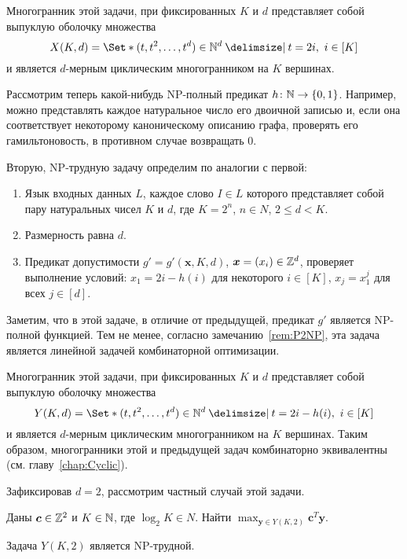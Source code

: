 Многогранник этой задачи, при фиксированных $K$ и $d$ представляет собой выпуклую оболочку множества
\[
X(K,d) = \Set*{(t, t^2, \dots, t^d) \in \N^d \given t = 2i, \ i\in[K]}
\]
и является $d$-мерным циклическим многогранником на $K$ вершинах.

Рассмотрим теперь какой-нибудь NP-полный предикат $h \colon \mathbb{N} \to \{0,1\}$. 
Например, можно представлять каждое натуральное число его двоичной записью и, если она соответствует некоторому каноническому описанию графа, проверять его гамильтоновость, в противном случае возвращать 0.

Вторую, NP-трудную задачу определим по аналогии с первой:
\begin{enumerate}
	\item Язык входных данных $L$, каждое слово $I \in L$ которого представляет собой пару натуральных чисел $K$ и $d$, где $K = 2^n$, $n \in N$, $2 \le d < K$.
	\item Размерность равна $d$.
	\item Предикат допустимости $g' = g'(\bm{x},K,d)$, $\bm{x} = (x_i) \in \mathbb{Z}^d$, проверяет выполнение условий: $x_1 = 2i - h(i)$ для некоторого $i \in [K]$, $x_j = x_1^j$ для всех $j \in [d]$.
\end{enumerate}
Заметим, что в этой задаче, в отличие от предыдущей, предикат $g'$ является NP-полной функцией.
Тем не менее, согласно замечанию~\ref{rem:P2NP}, эта задача является линейной задачей комбинаторной оптимизации.

Многогранник этой задачи, при фиксированных $K$ и $d$ представляет собой выпуклую оболочку множества
\[
Y(K,d) = \Set*{(t, t^2, \dots, t^d) \in \N^d \given t = 2i - h(i), \ i\in[K]}
\]
и является $d$-мерным циклическим многогранником на $K$ вершинах.
Таким образом, многогранники этой и предыдущей задач комбинаторно эквивалентны (см. главу~\ref{chap:Cyclic}).

Зафиксировав $d = 2$, рассмотрим частный случай этой задачи.

Даны $\bm{c} \in \mathbb{Z}^2$ и $K \in \mathbb{N}$, где $\log_2 K \in N$.
Найти $\max_{\bm{y}\in Y(K,2)} \bm{c}^T \bm{y}$.


\begin{prop}
Задача $Y(K,2)$ является NP-трудной.
\end{prop}

